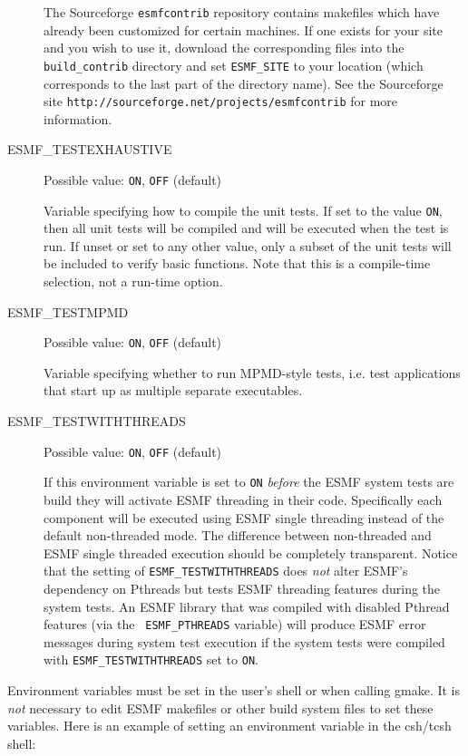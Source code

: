 \begin{description}
The Sourceforge {\tt esmfcontrib} repository contains makefiles which have 
already been customized for certain machines.  If one exists for your site 
and you wish to use it, download the corresponding files into the 
{\tt build\_contrib} directory and set {\tt ESMF\_SITE} to your location
(which corresponds to the last part of the directory name).  See the 
Sourceforge site {\tt http://sourceforge.net/projects/esmfcontrib} for more 
information.

\item[ESMF\_TESTEXHAUSTIVE] 
Possible value: {\tt ON}, {\tt OFF} (default)

Variable specifying how to compile the unit tests. If set to the value {\tt ON},
then all unit tests will be compiled and will be executed when the test is
run.  If unset or set to any other value, only a subset of the unit tests
will be included to verify basic functions. Note that this is a compile-time
selection, not a run-time option.

\item[ESMF\_TESTMPMD] 
Possible value: {\tt ON}, {\tt OFF} (default)

Variable specifying whether to run MPMD-style tests, i.e. test applications
that start up as multiple separate executables.

\item[ESMF\_TESTWITHTHREADS]
Possible value: {\tt ON}, {\tt OFF} (default)

If this environment variable is set to {\tt ON} {\em before} the ESMF system
tests are build they will activate ESMF threading in their code. Specifically
each component will be executed using ESMF single threading instead of the
default non-threaded mode. The difference between non-threaded and ESMF
single threaded execution should be completely transparent. Notice that the
setting of {\tt ESMF\_TESTWITHTHREADS} does {\em not} alter ESMF's dependency
on Pthreads but tests ESMF threading features during the system tests. An
ESMF library that was compiled with disabled Pthread features (via the {\tt
ESMF\_PTHREADS} variable) will produce ESMF error messages during system test
execution if the system tests were compiled with {\tt ESMF\_TESTWITHTHREADS}
set to {\tt ON}.

\end{description}

Environment variables must be set in the user's shell or when calling gmake. It
is {\em not} necessary to edit ESMF makefiles or other build system files to set
these variables. Here is an example of setting an environment variable in the
csh/tcsh shell:


